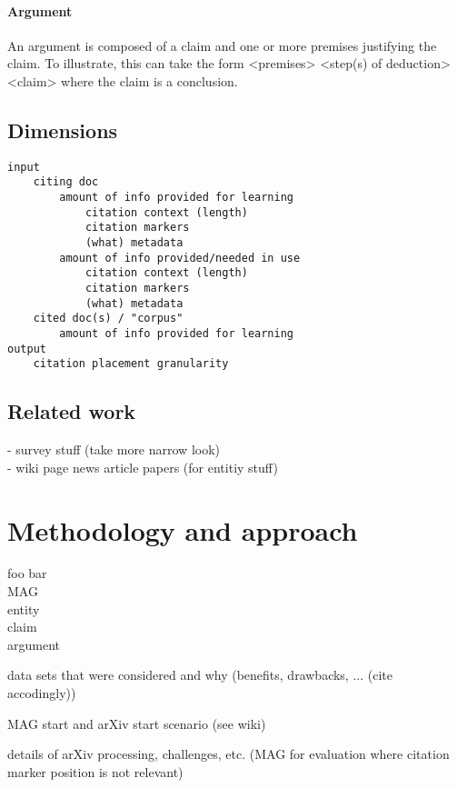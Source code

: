 \documentclass{proseminar}
\begin{document}
\paragraph{Argument}
An argument is composed of a claim and one or more premises justifying the claim. To illustrate, this can take the form <premises> <step(s) of deduction> <claim> where the claim is a conclusion.\cite{Besnard2008}

\subsection{Dimensions}\label{dimensions}
\begin{verbatim}
input
    citing doc
        amount of info provided for learning
            citation context (length)
            citation markers
            (what) metadata
        amount of info provided/needed in use
            citation context (length)
            citation markers
            (what) metadata
    cited doc(s) / "corpus"
        amount of info provided for learning
output
    citation placement granularity
\end{verbatim}


\subsection{Related work}
- survey stuff (take more narrow look)\\
- wiki page news article papers (for entitiy stuff)

\section{Methodology and approach}
foo bar\\
MAG\cite{Paszcza2016}\cite{Herrmannova2016}\cite{Hug2017}\cite{Sinha2015}\\
entity\cite{Mishra2016}\\
claim\cite{Levy2014}\\
argument\cite{Goudas2014}

data sets that were considered and why (benefits, drawbacks, ... (cite accodingly))

MAG start and arXiv start scenario (see wiki)

details of arXiv processing, challenges, etc. (MAG for evaluation where citation marker position is not relevant)
\end{document}
